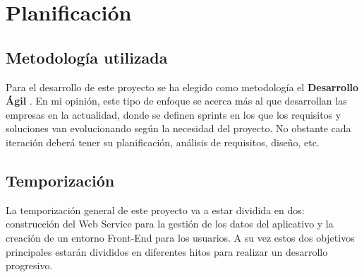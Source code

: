 \chapter{Planificación}

\section{Metodología utilizada}

Para el desarrollo de este proyecto se ha elegido como metodología el \textbf{Desarrollo Ágil} \cite{tas}.
En mi opinión, este tipo de enfoque se acerca más al que desarrollan las empresas en la actualidad, donde se
definen sprints en los que los requisitos y soluciones van evolucionando según la necesidad del proyecto.
No obstante cada iteración deberá tener su planificación, análisis de requisitos, diseño, etc.

\section{Temporización}

La temporización general de este proyecto va a estar dividida en dos: construcción del Web Service para la
gestión de los datos del aplicativo y la creación de un entorno Front-End para los usuarios. A su vez estos dos
objetivos principales estarán divididos en diferentes hitos para realizar un desarrollo progresivo.

